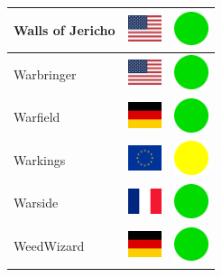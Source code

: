 \documentclass[12pt, a4paper, twoside]{report}
\begin{document}
\begin{center}
\begin{longtable}{|p{5cm}|p{2cm}|p{2cm}|}
 Walls of Jericho                                           & \includegraphics[width=1cm]{../img/flags/us} &   \includegraphics[width=1cm]{../likes/y} \\ \hline
 Warbringer                                                 & \includegraphics[width=1cm]{../img/flags/us} &   \includegraphics[width=1cm]{../likes/y} \\ \hline
 Warfield                                                   & \includegraphics[width=1cm]{../img/flags/de} &   \includegraphics[width=1cm]{../likes/y} \\ \hline
 Warkings                                                   & \includegraphics[width=1cm]{../img/flags/eu} &   \includegraphics[width=1cm]{../likes/m} \\ \hline
 Warside                                                    & \includegraphics[width=1cm]{../img/flags/fr} &   \includegraphics[width=1cm]{../likes/y} \\ \hline
 WeedWizard                                                 & \includegraphics[width=1cm]{../img/flags/de} &   \includegraphics[width=1cm]{../likes/y} \\ \hline

\end{longtable}
\end{center}
\end{document}
